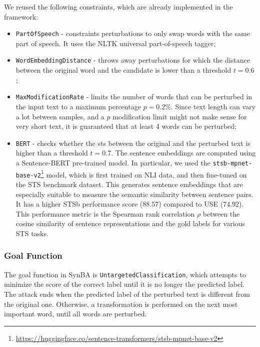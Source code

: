 We reused the following constraints, which are already implemented in the framework:
\begin{itemize}
    \item \texttt{PartOfSpeech} - constraints perturbations to only swap words with the same part of speech. It uses the NLTK universal part-of-speech tagger;
    \item \texttt{WordEmbeddingDistance} - throws away perturbations for which the distance between the original word and the candidate is lower than a threshold $t=0.6$;
    \item \texttt{MaxModificationRate} - limits the number of words that can be perturbed in the input text to a maximum percentage $p=0.2\%$. Since text length can vary a lot between samples, and a $p$ modification limit might not make sense for very short text, it is guaranteed that at least 4 words can be perturbed;
    \item \texttt{BERT} - checks whether the \acrfull{sts} between the original and the perturbed text is higher than a threshold $t=0.7$. The  sentence embeddings are computed using a Sentence-BERT \cite{reimers2019sentencebert} pre-trained model. In particular, we used the \texttt{stsb-mpnet-base-v2}\footnote{\url{https://huggingface.co/sentence-transformers/stsb-mpnet-base-v2}} model, which is first trained on NLI data, and then fine-tuned on the STS benchmark dataset. This generates sentence embeddings that are especially suitable to measure the semantic similarity between sentence pairs.
    It has a higher STSb performance score ($88.57$) compared to USE ($74.92$). This performance metric is the Spearman rank correlation $\rho$ between the cosine similarity of sentence representations and the gold labels for various STS tasks.
\end{itemize}           

\subsubsection{Goal Function}\label{subsubsec:goal-function}

The goal function in SynBA is \texttt{UntargetedClassification}, which attempts to minimize the score of the correct label until it is no longer the predicted label.
The attack ends when the predicted label of the perturbed text is different from the original one.
Otherwise, a transformation is performed on the next most important word, until all words are perturbed.

